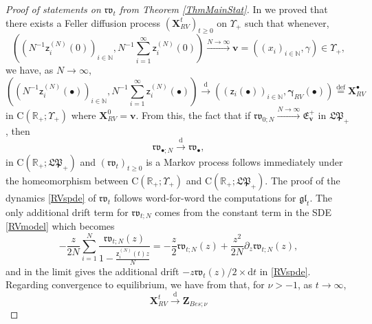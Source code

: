 \documentclass[]{article}
\begin{document}
\begin{proof}[Proof of statements on $\mathfrak{rv}_t$ from Theorem \ref{ThmMainStat}]  In \cite{AM24} we proved that there exists a Feller diffusion process $(\mathbf{X}_{RV}^t)_{t\ge 0}$ on $\Upsilon_+$ such that whenever, 
\begin{equation*}
\left((N^{-1}\mathsf{z}_i^{(N)}(0))_{i\in \mathbb{N}},N^{-1}\sum_{i=1}^\infty \mathsf{z}_i^{(N)}(0)\right)  \overset{N \to \infty}{\longrightarrow} \boldsymbol{v}=((x_i)_{i\in \mathbb{N}},\gamma)\in \Upsilon_+,
\end{equation*}
we have, as $N \to \infty$,
\begin{equation*}
\left((N^{-1}\mathsf{z}_i^{(N)}(\bullet))_{i\in \mathbb{N}},N^{-1}\sum_{i=1}^\infty \mathsf{z}_i^{(N)}(\bullet)\right) \overset{\mathrm{d}}{\longrightarrow} \left((\mathsf{z}_i(\bullet))_{i\in \mathbb{N}},\boldsymbol{\gamma}_{RV}(\bullet)\right)\overset{\mathrm{def}}{=} \mathbf{X}_{RV}^\bullet
\end{equation*}
in $\mathrm{C}(\mathbb{R}_+;\Upsilon_+)$
where $\mathbf{X}_{RV}^0=\boldsymbol{v}$. From this, the fact that if $\mathfrak{rv}_{0;N} \overset{N \to \infty}{\longrightarrow} \mathfrak{E}_{\boldsymbol{v}}^+$ in $\mathfrak{LP}_+$, then
\begin{equation*}
\mathfrak{rv}_{\bullet;N}\overset{\mathrm{d}}{\longrightarrow} \mathfrak{rv}_\bullet,
\end{equation*}
in $\mathrm{C}(\mathbb{R}_+;\mathfrak{LP}_+)$ and  $(\mathfrak{rv}_t)_{t\ge 0}$ is a Markov process follows immediately under the homeomorphism between $\mathrm{C}(\mathbb{R}_+;\Upsilon_+)$ and $\mathrm{C}(\mathbb{R}_+;\mathfrak{LP}_+)$. The proof of the dynamics \eqref{RVspde} of $\mathfrak{rv}_t$ follows word-for-word the computations for $\mathfrak{gl}_t$. The only additional drift term for $\mathfrak{rv}_{t;N}$ comes from the constant term in the SDE \eqref{RVmodel} which becomes
\begin{equation*}
-\frac{z}{2N}\sum_{i=1}^N\frac{\mathfrak{rv}_{t;N}\left(z\right)}{1-\frac{\mathsf{z}_i^{(N)}(t)z}{N}}
=-\frac{z}{2}\mathfrak{rv}_{t;N}(z)
    +
\frac{z^2}{2N}\partial_z\mathfrak{rv}_{t;N}(z), 
\end{equation*}
and in the limit gives the additional drift $-z\mathfrak{rv}_{t}(z)/2\times\mathrm{d}t$ in \eqref{RVspde}.
Regarding convergence to equilibrium, we have from \cite{AM24} that, for $\nu>-1$, as $t\to \infty$, 
\begin{equation*}
\mathbf{X}_{RV}^t \overset{\mathrm{d}}{\longrightarrow} \mathbf{Z}_{Bes;\nu}

\end{equation*}
\end{proof}
\end{document}
